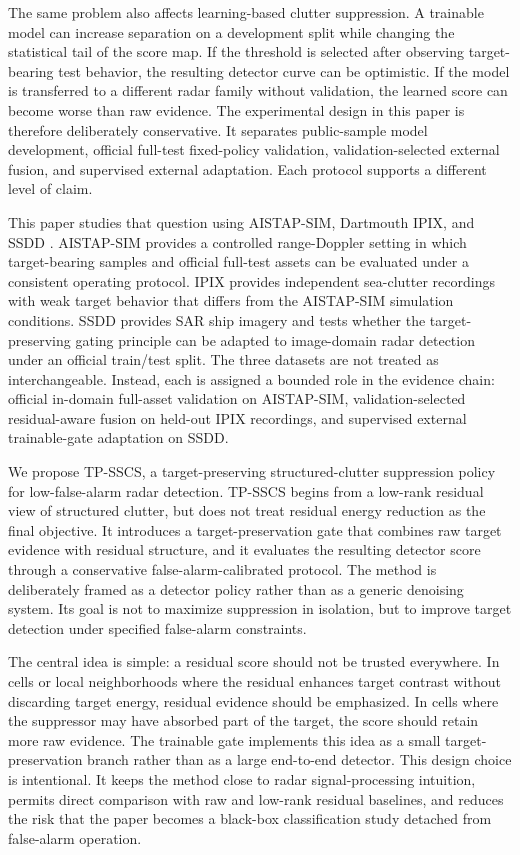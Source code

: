 \documentclass[journal]{IEEEtran}
\begin{document}
The same problem also affects learning-based clutter suppression. A trainable model can increase separation on a development split while changing the statistical tail of the score map. If the threshold is selected after observing target-bearing test behavior, the resulting detector curve can be optimistic. If the model is transferred to a different radar family without validation, the learned score can become worse than raw evidence. The experimental design in this paper is therefore deliberately conservative. It separates public-sample model development, official full-test fixed-policy validation, validation-selected external fusion, and supervised external adaptation. Each protocol supports a different level of claim.

This paper studies that question using AISTAP-SIM, Dartmouth IPIX, and SSDD \cite{vega2024aistap,haykin2002seaclutter,dewind2010database,zhang2021ssdd}. AISTAP-SIM provides a controlled range-Doppler setting in which target-bearing samples and official full-test assets can be evaluated under a consistent operating protocol. IPIX provides independent sea-clutter recordings with weak target behavior that differs from the AISTAP-SIM simulation conditions. SSDD provides SAR ship imagery and tests whether the target-preserving gating principle can be adapted to image-domain radar detection under an official train/test split. The three datasets are not treated as interchangeable. Instead, each is assigned a bounded role in the evidence chain: official in-domain full-asset validation on AISTAP-SIM, validation-selected residual-aware fusion on held-out IPIX recordings, and supervised external trainable-gate adaptation on SSDD.

We propose TP-SSCS, a target-preserving structured-clutter suppression policy for low-false-alarm radar detection. TP-SSCS begins from a low-rank residual view of structured clutter, but does not treat residual energy reduction as the final objective. It introduces a target-preservation gate that combines raw target evidence with residual structure, and it evaluates the resulting detector score through a conservative false-alarm-calibrated protocol. The method is deliberately framed as a detector policy rather than as a generic denoising system. Its goal is not to maximize suppression in isolation, but to improve target detection under specified false-alarm constraints.

The central idea is simple: a residual score should not be trusted everywhere. In cells or local neighborhoods where the residual enhances target contrast without discarding target energy, residual evidence should be emphasized. In cells where the suppressor may have absorbed part of the target, the score should retain more raw evidence. The trainable gate implements this idea as a small target-preservation branch rather than as a large end-to-end detector. This design choice is intentional. It keeps the method close to radar signal-processing intuition, permits direct comparison with raw and low-rank residual baselines, and reduces the risk that the paper becomes a black-box classification study detached from false-alarm operation.
\end{document}
